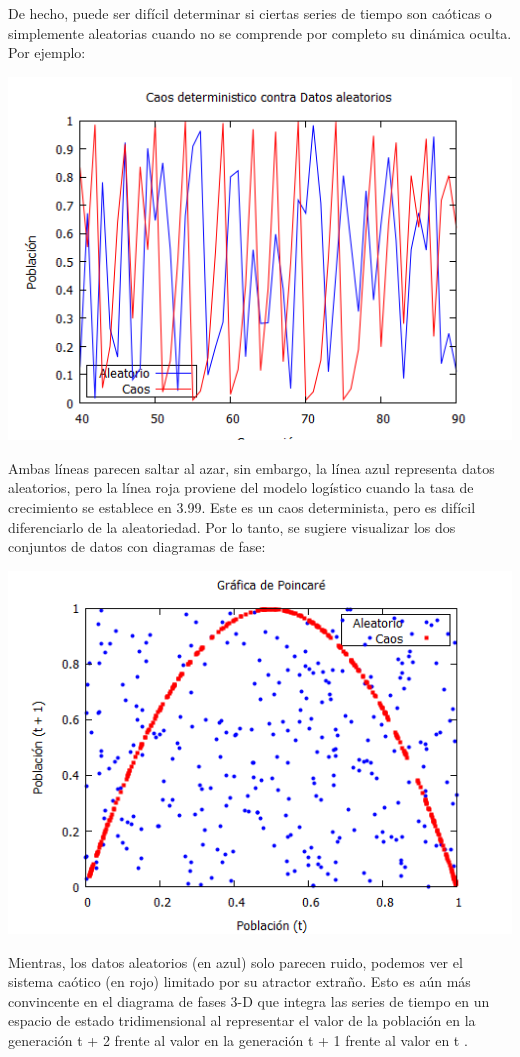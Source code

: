 \documentclass{article}
\begin{document}
De hecho, puede ser difícil determinar si ciertas series de tiempo son caóticas o simplemente aleatorias cuando no se comprende por completo su dinámica oculta. Por ejemplo:

\begin{center}
\includegraphics[width=.8\textwidth]{Imagen10.PNG}
\end{center}

Ambas líneas parecen saltar al azar, sin embargo, la línea azul representa datos aleatorios, pero la línea roja proviene del modelo logístico cuando la tasa de crecimiento se establece en 3.99. Este es un caos determinista, pero es difícil diferenciarlo de la aleatoriedad. Por lo tanto, se sugiere visualizar los dos conjuntos de datos con diagramas de fase:

\begin{center}
\includegraphics[width=.8\textwidth]{Imagen11.PNG}
\end{center}

Mientras, los datos aleatorios (en azul) solo parecen ruido, podemos ver el sistema caótico (en rojo) limitado por su atractor extraño. Esto es aún más convincente en el diagrama de fases 3-D que integra las series de tiempo en un espacio de estado tridimensional al representar el valor de la población en la generación t + 2 frente al valor en la generación t + 1 frente al valor en t .
\end{document}
